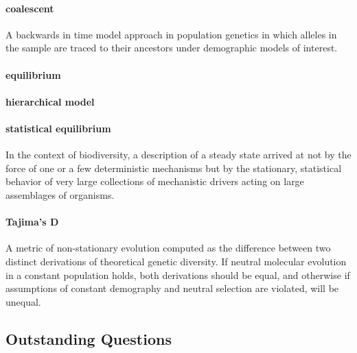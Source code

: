 \documentclass[12pt]{article}
\begin{document}
\paragraph{coalescent} A backwards in time model approach in
population genetics in which alleles in the sample are traced to their
ancestors under demographic models of interest.

\paragraph{equilibrium}

\paragraph{hierarchical model}

\paragraph{statistical equilibrium} In the context of biodiversity, a
description of a steady state arrived at not by the force of one or a
few deterministic mechanisms but by the stationary, statistical
behavior of very large collections of mechanistic drivers acting on
large assemblages of organisms.

\paragraph{Tajima's D} A metric of non-stationary evolution computed
as the difference between two distinct derivations of theoretical
genetic diversity. If neutral molecular evolution in a constant
population holds, both derivations should be equal, and otherwise if
assumptions of constant demography and neutral selection are violated,
will be unequal.

\subsection*{Outstanding Questions}
\end{document}
